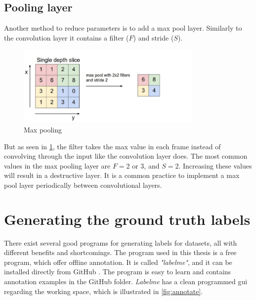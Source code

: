 \documentclass[USenglish]{ifimaster}  %
\begin{document}
\subsection{Pooling layer}
Another method to reduce parameters is to add a max pool layer. Similarly to the convolution layer it contains a filter ($F$) and stride ($S$). 

\begin{figure}[H]
    \centering
    \includegraphics[width=0.8\textwidth]{bilder/max_pooling.png}
    \caption{Max pooling \cite{website:cs231n}}
    \label{fig:max_pooling}
\end{figure}

But as seen in \cref{fig:max_pooling}, the filter takes the max value in each frame instead of convolving through the input like the convolution layer does. The most common values in the max pooling layer are $F=$2 or 3, and $S=2$. Increasing these values will result in a destructive layer. It is a common practice to implement a max pool layer periodically between convolutional layers.

\section{Generating the ground truth labels}
There exist several good programs for generating labels for datasets, all with different benefits and shortcomings. The program used in this thesis is a free program, which offer offline annotation. It is called \textit{"labelme"}, and it can be installed directly from GitHub \cite{website:labelme}. The program is easy to learn and contains annotation examples in the GitHub folder. \textit{Labelme} has a clean programmed \ac{gui} regarding the working space, which is illustrated in \cref{fig:annotate}. 
\end{document}
